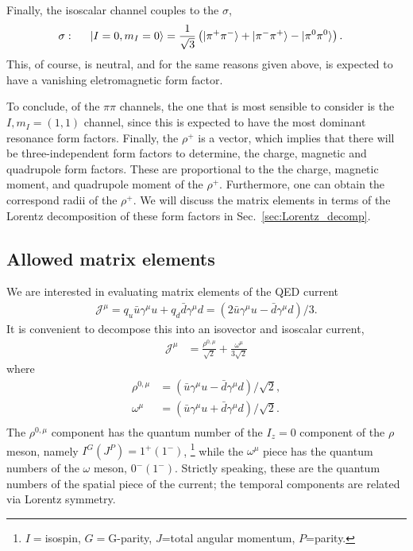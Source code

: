 Finally, the isoscalar channel couples to the $\sigma$,
\begin{align}
\sigma:\hspace{.5cm}|I=0,m_I=0\rangle&=\frac{1}{\sqrt{3}}\left(|\pi^+\pi^-\rangle+|\pi^-\pi^+\rangle-|\pi^0\pi^0\rangle\right).
\end{align}
This, of course, is neutral, and for the same reasons given above, is expected to have a vanishing eletromagnetic form factor. 

To conclude, of the $\pi\pi$ channels, the one that is most sensible to consider is the $I,m_I=(1,1)$ channel, since this is expected to have the most dominant resonance form factors. Finally, the $\rho^+$ is a vector, which implies that there will be three-independent form factors to determine, the charge, magnetic and quadrupole form factors. These are proportional to the the charge, magnetic moment, and quadrupole moment of the $\rho^+$. Furthermore, one can obtain the correspond radii of the $\rho^+$. We will discuss the matrix elements in terms of the Lorentz decomposition of these form factors in Sec.~\ref{sec:Lorentz_decomp}.

 \subsection{Allowed matrix elements}

We are interested in evaluating matrix elements of the QED current
\begin{align}
{\mathcal{J}}^{\mu}=q_u\bar{u}\gamma^\mu u+q_d\bar{d}\gamma^\mu d=(2\bar{u}\gamma^\mu u-\bar{d}\gamma^\mu d)/3.
\end{align} 
It is convenient to decompose this into an isovector and isoscalar current, 
\begin{align}
{\mathcal{J}}^{\mu}&=\frac{ \rho^{0,\mu}}{\sqrt{2}}+\frac{\omega^{\mu}}{3\sqrt{2}}
\end{align}
where
\begin{align}
\rho^{0,\mu}&=(\bar{u}\gamma^\mu u-\bar{d}\gamma^\mu d)/\sqrt{2},\\
\omega^{\mu}&=(\bar{u}\gamma^\mu u+\bar{d}\gamma^\mu d)/\sqrt{2}.\\
\end{align} 
The $\rho^{0,\mu}$ component has the quantum number of the $I_z=0$ component of the $\rho$ meson, namely $I^G(J^{P})=1^{+}(1^{-})$,
\footnote{$I=$isospin, $G=$G-parity, $J$=total angular momentum, $P$=parity.}
while the $\omega^{\mu}$ piece has the quantum numbers of the $\omega$ meson, $0^{-}(1^{-})$. Strictly speaking, these are the quantum numbers of the spatial piece of the current; the temporal components are related via Lorentz symmetry. 


